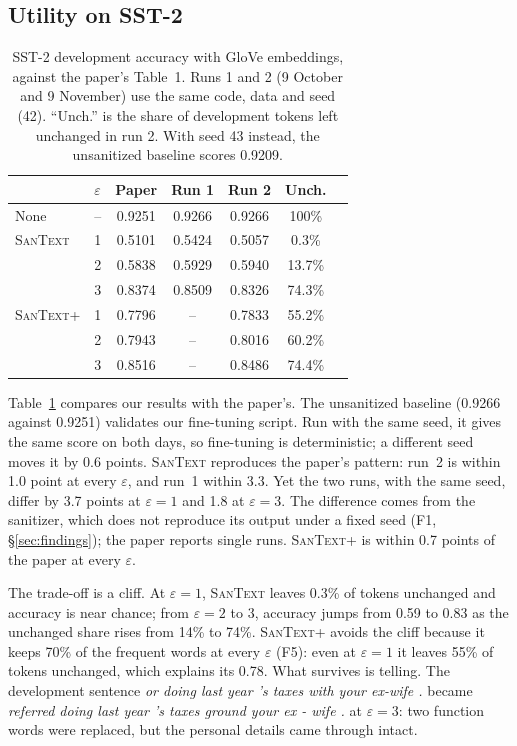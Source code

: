 \documentclass[11pt]{article}
\newcommand{\santext}{\textsc{SanText}}
\newcommand{\santextp}{\textsc{SanText}+}
\begin{document}
\subsection{Utility on SST-2}
\begin{table}[t]
\centering\small
\setlength{\tabcolsep}{4.5pt}
\begin{tabular}{@{}llccccc@{}}
\toprule
 & $\varepsilon$ & Paper & Run 1 & Run 2 & Unch. \\
\midrule
None & -- & 0.9251 & 0.9266 & 0.9266 & 100\% \\
\santext & 1 & 0.5101 & 0.5424 & 0.5057 & 0.3\% \\
 & 2 & 0.5838 & 0.5929 & 0.5940 & 13.7\% \\
 & 3 & 0.8374 & 0.8509 & 0.8326 & 74.3\% \\
\santextp & 1 & 0.7796 & -- & 0.7833 & 55.2\% \\
 & 2 & 0.7943 & -- & 0.8016 & 60.2\% \\
 & 3 & 0.8516 & -- & 0.8486 & 74.4\% \\
\bottomrule
\end{tabular}
\caption{SST-2 development accuracy with GloVe embeddings, against the paper's Table~1. Runs 1 and 2 (9 October and 9 November) use the same code, data and seed (42). ``Unch.'' is the share of development tokens left unchanged in run 2. With seed 43 instead, the unsanitized baseline scores 0.9209.}
\label{tab:sst2}
\end{table}

Table~\ref{tab:sst2} compares our results with the paper's. The unsanitized baseline (0.9266 against 0.9251) validates our fine-tuning script. Run with the same seed, it gives the same score on both days, so fine-tuning is deterministic; a different seed moves it by 0.6 points. \santext{} reproduces the paper's pattern: run~2 is within 1.0 point at every $\varepsilon$, and run~1 within 3.3. Yet the two runs, with the same seed, differ by 3.7 points at $\varepsilon = 1$ and 1.8 at $\varepsilon = 3$. The difference comes from the sanitizer, which does not reproduce its output under a fixed seed (F1, §\ref{sec:findings}); the paper reports single runs. \santextp{} is within 0.7 points of the paper at every $\varepsilon$.

The trade-off is a cliff. At $\varepsilon = 1$, \santext{} leaves 0.3\% of tokens unchanged and accuracy is near chance; from $\varepsilon = 2$ to $3$, accuracy jumps from 0.59 to 0.83 as the unchanged share rises from 14\% to 74\%. \santextp{} avoids the cliff because it keeps 70\% of the frequent words at every $\varepsilon$ (F5): even at $\varepsilon = 1$ it leaves 55\% of tokens unchanged, which explains its 0.78. What survives is telling. The development sentence \textit{or doing last year 's taxes with your ex-wife .} became \textit{referred doing last year 's taxes ground your ex - wife .} at $\varepsilon = 3$: two function words were replaced, but the personal details came through intact.
\end{document}

